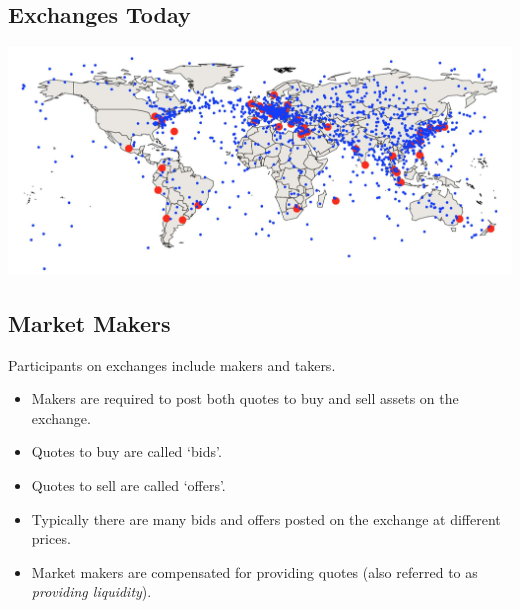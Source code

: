 \documentclass[letterpaper,10pt,english]{sphinxmanual}
\begin{document}
\subsection{Exchanges Today}
\label{trading:id6}
\includegraphics[width=6in]{worldExchanges.png}


\subsection{Market Makers}
\label{trading:market-makers}
Participants on exchanges include makers and takers.
\begin{itemize}
\item {} 
Makers are required to post both quotes to buy and sell assets on
the exchange.

\end{itemize}
\begin{itemize}
\item {} 
Quotes to buy are called `bids'.

\end{itemize}
\begin{itemize}
\item {} 
Quotes to sell are called `offers'.

\end{itemize}
\begin{itemize}
\item {} 
Typically there are many bids and offers posted on the exchange at
different prices.

\end{itemize}
\begin{itemize}
\item {} 
Market makers are compensated for providing quotes (also referred to
as \emph{providing liquidity}).

\end{itemize}
\end{document}
